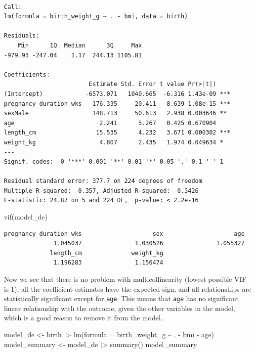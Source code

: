 \documentclass[
  letterpaper,
  DIV=11,
  numbers=noendperiod]{scrreprt}
\newenvironment{Shaded}{\begin{snugshade}}{\end{snugshade}}
\newcommand{\AttributeTok}[1]{\textcolor[rgb]{0.40,0.45,0.13}{#1}}
\newcommand{\FunctionTok}[1]{\textcolor[rgb]{0.28,0.35,0.67}{#1}}
\newcommand{\NormalTok}[1]{\textcolor[rgb]{0.00,0.23,0.31}{#1}}
\newcommand{\OtherTok}[1]{\textcolor[rgb]{0.00,0.23,0.31}{#1}}
\newcommand{\SpecialCharTok}[1]{\textcolor[rgb]{0.37,0.37,0.37}{#1}}
\begin{document}
\begin{verbatim}

Call:
lm(formula = birth_weight_g ~ . - bmi, data = birth)

Residuals:
    Min      1Q  Median      3Q     Max 
-979.93 -247.04    1.17  244.13 1105.81 

Coefficients:
                        Estimate Std. Error t value Pr(>|t|)    
(Intercept)            -6573.071   1040.665  -6.316 1.43e-09 ***
pregnancy_duration_wks   176.335     20.411   8.639 1.08e-15 ***
sexMale                  148.713     50.613   2.938 0.003646 ** 
age                        2.241      5.267   0.425 0.670904    
length_cm                 15.535      4.232   3.671 0.000302 ***
weight_kg                  4.807      2.435   1.974 0.049634 *  
---
Signif. codes:  0 '***' 0.001 '**' 0.01 '*' 0.05 '.' 0.1 ' ' 1

Residual standard error: 377.7 on 224 degrees of freedom
Multiple R-squared:  0.357, Adjusted R-squared:  0.3426 
F-statistic: 24.87 on 5 and 224 DF,  p-value: < 2.2e-16
\end{verbatim}

\begin{Shaded}
\begin{Highlighting}[]
\FunctionTok{vif}\NormalTok{(model\_de)}
\end{Highlighting}
\end{Shaded}

\begin{verbatim}
pregnancy_duration_wks                    sex                    age 
              1.045037               1.030526               1.055327 
             length_cm              weight_kg 
              1.196283               1.156474 
\end{verbatim}

Now we see that there is no problem with multicollinearity (lowest
possible VIF is 1), all the coefficient estimates have the expected
sign, and all relationships are statistically significant except for
\texttt{age}. This means that \texttt{age} has no significant linear
relationship with the outcome, given the other variables in the model,
which is a good reason to remove it from the model.

\begin{Shaded}
\begin{Highlighting}[]
\NormalTok{model\_de }\OtherTok{\textless{}{-}}\NormalTok{ birth }\SpecialCharTok{|\textgreater{}} 
  \FunctionTok{lm}\NormalTok{(}\AttributeTok{formula =}\NormalTok{ birth\_weight\_g }\SpecialCharTok{\textasciitilde{}}\NormalTok{ . }\SpecialCharTok{{-}}\NormalTok{ bmi }\SpecialCharTok{{-}}\NormalTok{ age)}
\NormalTok{model\_summary }\OtherTok{\textless{}{-}}\NormalTok{ model\_de }\SpecialCharTok{|\textgreater{}} \FunctionTok{summary}\NormalTok{()}
\NormalTok{model\_summary}
\end{Highlighting}
\end{Shaded}
\end{document}
